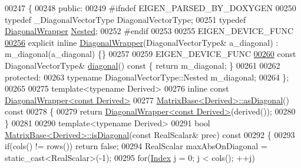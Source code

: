 \begin{DoxyCode}
00247 \{
00248   \textcolor{keyword}{public}:
00249 \textcolor{preprocessor}{    #ifndef EIGEN\_PARSED\_BY\_DOXYGEN}
00250     \textcolor{keyword}{typedef} \_DiagonalVectorType DiagonalVectorType;
00251     \textcolor{keyword}{typedef} \hyperlink{group___core___module_class_eigen_1_1_diagonal_wrapper}{DiagonalWrapper} \hyperlink{group___core___module_class_eigen_1_1_diagonal_matrix}{Nested};
00252 \textcolor{preprocessor}{    #endif}
00253 
00255     EIGEN\_DEVICE\_FUNC
\hyperlink{group___core___module_a81574f47272fd5e519a19135a306529d}{00256}     \textcolor{keyword}{explicit} \textcolor{keyword}{inline} \hyperlink{group___core___module_a81574f47272fd5e519a19135a306529d}{DiagonalWrapper}(DiagonalVectorType& a\_diagonal) : m\_diagonal(a\_diagonal)
       \{\}
00257 
00259     EIGEN\_DEVICE\_FUNC
\hyperlink{group___core___module_a8e84e44aa74ab66f54ffb45e439ef0d5}{00260}     \textcolor{keyword}{const} DiagonalVectorType& \hyperlink{group___core___module_a8e84e44aa74ab66f54ffb45e439ef0d5}{diagonal}()\textcolor{keyword}{ const }\{ \textcolor{keywordflow}{return} m\_diagonal; \}
00261 
00262   \textcolor{keyword}{protected}:
00263     \textcolor{keyword}{typename} DiagonalVectorType::Nested m\_diagonal;
00264 \};
00265 
00275 \textcolor{keyword}{template}<\textcolor{keyword}{typename} Derived>
00276 \textcolor{keyword}{inline} \textcolor{keyword}{const} \hyperlink{group___core___module_class_eigen_1_1_diagonal_wrapper}{DiagonalWrapper<const Derived>}
00277 \hyperlink{group___core___module_a14235b62c90f93fe910070b4743782d0}{MatrixBase<Derived>::asDiagonal}()\textcolor{keyword}{ const}
00278 \textcolor{keyword}{}\{
00279   \textcolor{keywordflow}{return} \hyperlink{group___core___module_class_eigen_1_1_diagonal_wrapper}{DiagonalWrapper<const Derived>}(derived());
00280 \}
00281 
00290 \textcolor{keyword}{template}<\textcolor{keyword}{typename} Derived>
00291 \textcolor{keywordtype}{bool} \hyperlink{group___core___module_a97027ea54c8cd1ddb1c578fee5cedc67}{MatrixBase<Derived>::isDiagonal}(\textcolor{keyword}{const} RealScalar& prec)\textcolor{keyword}{ const}
00292 \textcolor{keyword}{}\{
00293   \textcolor{keywordflow}{if}(cols() != rows()) \textcolor{keywordflow}{return} \textcolor{keyword}{false};
00294   RealScalar maxAbsOnDiagonal = \textcolor{keyword}{static\_cast<}RealScalar\textcolor{keyword}{>}(-1);
00295   \textcolor{keywordflow}{for}(\hyperlink{group___core___module_a554f30542cc2316add4b1ea0a492ff02}{Index} j = 0; j < cols(); ++j)

\end{DoxyCode}
